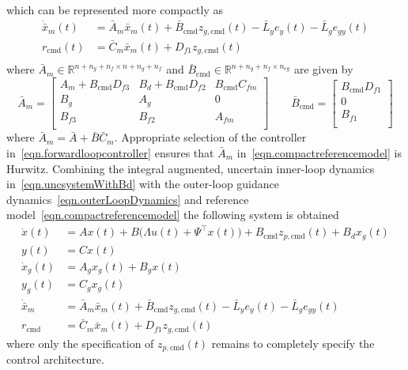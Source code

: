 which can be represented more compactly as
\begin{equation}
  \label{eqn.compactreferencemodel}
  \begin{split}
    \dot{\bar{x}}_{m}(t) &= \bar{A}_{m}\bar{x}_{m}(t) + \bar{B}_{\text{cmd}}z_{g,\text{cmd}}(t) - \bar{L}_{y}e_{y}(t) - \bar{L}_{g}e_{gy}(t) \\
    r_{\text{cmd}}(t) &= \bar{C}_{m}\bar{x}_{m}(t) + D_{f1}z_{g,\text{cmd}}(t) \\
  \end{split}
\end{equation}
where $\bar{A}_{m}\in\mathbb{R}^{n+n_{g}+n_{f}\times n+n_{g}+n_{f}}$ and $\bar{B}_{\text{cmd}}\in\mathbb{R}^{n+n_{g}+n_{f}\times n_{eg}}$ are given by
\begin{equation}
  \bar{A}_{m} =
  \begin{bmatrix}
    A_{m}+B_{\text{cmd}}D_{f3} & B_{d} + B_{\text{cmd}}D_{f2} & B_{\text{cmd}}C_{fm} \\
    B_{g} & A_{g} & 0 \\
    B_{f3} & B_{f2} & A_{fm} \\
  \end{bmatrix}
  \qquad
  \bar{B}_{\text{cmd}} =
  \begin{bmatrix}
    B_{\text{cmd}}D_{f1} \\
    0 \\
    B_{f1} \\
  \end{bmatrix}
\end{equation}
where $\bar{A}_{m} = \bar{A}+\bar{B}\bar{C}_{m}$.
Appropriate selection of the controller in\ \eqref{eqn.forwardloopcontroller} ensures that $\bar{A}_{m}$ in\ \eqref{eqn.compactreferencemodel} is Hurwitz.
Combining the integral augmented, uncertain inner-loop dynamics in\ \eqref{eqn.uncsystemWithBd} with the outer-loop guidance dynamics\ \eqref{eqn.outerLoopDynamics} and reference model\ \eqref{eqn.compactreferencemodel} the following system is obtained
\begin{equation}
  \label{eqn.plantAndCompactReferenceModel}
  \begin{aligned}
    \dot{x}(t)
    &=
    Ax(t) + B\bigr(\Lambda u(t)+\Psi^{\top}x(t)\bigr) + B_{\text{cmd}}z_{p,\text{cmd}}(t) + B_{d}x_{g}(t) \\
    y(t)
    &=
    Cx(t) \\
    \dot{x}_{g}(t)
    &=
    A_{g}x_{g}(t) + B_{g}x(t) \\
    y_{g}(t)
    &=
    C_{g}x_{g}(t) \\
    \dot{\bar{x}}_{m}
    &=
    \bar{A}_{m}\bar{x}_{m}(t) + \bar{B}_{\text{cmd}}z_{g,\text{cmd}}(t) - \bar{L}_{y}e_{y}(t) - \bar{L}_{g}e_{gy}(t) \\
    r_{\text{cmd}}
    &=
    \bar{C}_{m}\bar{x}_{m}(t) + D_{f1}z_{g,\text{cmd}}(t)
  \end{aligned}
\end{equation}
where only the specification of $z_{p,\text{cmd}}(t)$ remains to completely specify the control architecture.

